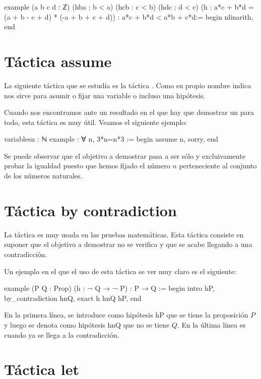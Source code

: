 \begin{leancode}
example (a b c d : ℤ)
  (hba : b < a)
  (hcb : c < b)
  (hdc : d < c)
  (h : a*c + b*d = (a + b - c + d) * (-a + b + c + d))
  : a*c + b*d < a*b + c*d:=
begin
  nlinarith,
end
\end{leancode}

\section{Táctica assume}

La siguiente táctica que se estudia es la táctica . Como
su propio nombre indica nos sirve para asumir o fijar una variable o incluso una
hipótesis.

Cuando nos encontramos ante un resultado en el que hay que demostrar un para
todo, esta táctica es muy útil. Veamos el siguiente ejemplo:

\begin{leancode}
variables{n : ℕ}
example : ∀ n, 3*n=n*3 :=
begin
  assume n,
  sorry,
end
\end{leancode}

Se puede observar que el objetivo a demostrar pasa a ser sólo y excluivamente
probar la igualdad puesto que hemos fijado el número \(n\) perteneciente al
conjunto de los números naturales.

\section{Táctica by contradiction}

La táctica  es muy
usada en las pruebas matemáticas. Esta táctica consiste en suponer que el
objetivo a demostrar no se verifica y que se acabe llegando a una contradicción.

Un ejemplo en el que el uso de esta táctica se ver muy claro es el siguiente:

\begin{leancode}
example (P Q : Prop) (h : ¬ Q → ¬ P) : P → Q :=
begin
  intro hP,
  by_contradiction hnQ,
  exact h hnQ hP,
end
\end{leancode}

En la primera línea, se introduce como hipótesis hP que se tiene la proposición
\(P\) y luego se denota como hipótesis hnQ que no se tiene \(Q\). En la última
línea es cuando ya se llega a la contradicción.

\section{Táctica let}

